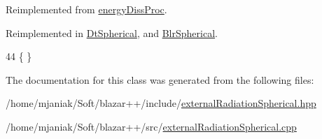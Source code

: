 Reimplemented from \hyperlink{classenergyDissProc_a6033524ea3d0fe38056bd74622f6c4ad}{energy\-Diss\-Proc}.



Reimplemented in \hyperlink{classDtSpherical_ab9844cfdd3df5bc213bf93dd7b320bb7}{Dt\-Spherical}, and \hyperlink{classBlrSpherical_ad67ab24f0b7f0ec3a0893fd2e3170f6c}{Blr\-Spherical}.


\begin{DoxyCode}
44 \{ \}
\end{DoxyCode}


The documentation for this class was generated from the following files\-:\begin{DoxyCompactItemize}
\item 
/home/mjaniak/\-Soft/blazar++/include/\hyperlink{externalRadiationSpherical_8hpp}{external\-Radiation\-Spherical.\-hpp}\item 
/home/mjaniak/\-Soft/blazar++/src/\hyperlink{externalRadiationSpherical_8cpp}{external\-Radiation\-Spherical.\-cpp}\end{DoxyCompactItemize}
